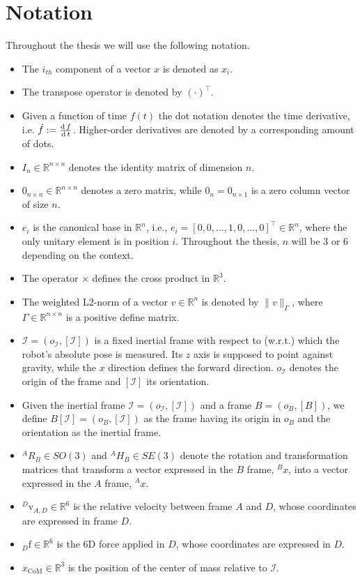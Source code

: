 \section{Notation}\label{sec:notation}
Throughout the thesis we will use the following notation.
\begin{itemize}
	\item The $i_{th}$ component of a vector ${x}$ is denoted as $x_i$. 
	\item The transpose operator is denoted by $(\cdot)^{\top}$.
	\item Given a function of time $f(t)$ the dot notation denotes the time derivative, i.e.
		$\dot{f} := \frac{\operatorname{d} f}{\operatorname{d} t}$. Higher-order derivatives are denoted by a corresponding amount of dots.
	\item $I_n \in \mathbb{R}^{n \times n}$ denotes the identity matrix of dimension $n$.
	\item ${0}_{n \times n} \in \mathbb{R}^{n \times n}$ denotes a zero matrix, while ${0}_n = {0}_{n \times 1}$ is a zero column vector of size $n$.
	\item ${e}_i$ is the canonical base in $\mathbb{R}^n$, i.e., ${e}_i = [0, 0, \dots, 1, 0, \dots, 0]^\top \in \mathbb{R}^n$, where the only unitary element is in position $i$. Throughout the thesis, $n$ will be 3 or 6 depending on the context. 
	\item The operator $\times$ defines the cross product in $\mathbb{R}^3$. 
	\item The weighted L2-norm of a vector ${v} \in \mathbb{R}^n$ is denoted by $\|{v}\|_{{\Gamma}}$, where ${\Gamma} \in \mathbb{R}^{n\times n}$ is a positive define matrix.
	\item $\mathcal{I} = (o_\mathcal{I}, [\mathcal{I}])$ is a fixed inertial frame with respect to (w.r.t.) 
	which the robot's absolute pose is measured. Its $z$ axis is supposed to point against gravity, while the $x$ direction defines the forward direction. $o_\mathcal{I}$ denotes the origin of the frame and $[\mathcal{I}]$ its orientation.
    \item Given the inertial frame $\mathcal{I}= (o_\mathcal{I}, [\mathcal{I}])$  and a frame $B= (o_B, [B])$, we define $B[\mathcal{I}] =(o_B, [\mathcal{I}])$ as the frame having its origin in $o_B$ and the orientation as the inertial frame. 
	\item $^{A}{R}_{B} \in SO(3)$ and $^{A}{H}_{B} \in SE(3)$ denote the rotation and transformation matrices that transform a vector expressed in the $B$ frame, $^B {x}$, into a vector expressed in the $A$ frame, $^A {x}$.
	\item ${}^D\mathrm{v}_{A,D} \in \mathbb{R}^6$ is the relative velocity between frame $A$ and $D$,  whose coordinates are expressed in frame $D$.
	\item ${}_D\mathrm{f}\in \mathbb{R}^6$ is the 6D force applied in $D$,  whose coordinates are expressed in $D$.
	\item ${x}_\text{CoM} \in  \mathbb{R}^3$ is the position of the center of mass relative to $\mathcal{I}$.
	
\end{itemize}